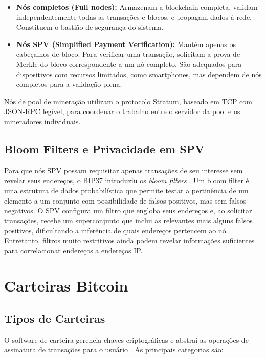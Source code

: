 \documentclass[12pt,a4paper]{report}
\begin{document}
\begin{itemize}
    \item \textbf{Nós completos (Full nodes):} Armazenam a blockchain completa, validam independentemente todas as transações e blocos, e propagam dados à rede. Constituem o bastião de segurança do sistema.
    \item \textbf{Nós SPV (Simplified Payment Verification):} Mantêm apenas os cabeçalhos de bloco. Para verificar uma transação, solicitam a prova de Merkle do bloco correspondente a um nó completo. São adequados para dispositivos com recursos limitados, como smartphones, mas dependem de nós completos para a validação plena.
\end{itemize}

Nós de pool de mineração utilizam o protocolo Stratum, baseado em TCP com JSON-RPC legível, para coordenar o trabalho entre o servidor da pool e os mineradores individuais.

\subsection{Bloom Filters e Privacidade em SPV}

Para que nós SPV possam requisitar apenas transações de seu interesse sem revelar seus endereços, o BIP37 introduziu os \textit{bloom filters} \cite{Bashir2023}. Um bloom filter é uma estrutura de dados probabilística que permite testar a pertinência de um elemento a um conjunto com possibilidade de falsos positivos, mas sem falsos negativos. O SPV configura um filtro que engloba seus endereços e, ao solicitar transações, recebe um superconjunto que inclui as relevantes mais alguns falsos positivos, dificultando a inferência de quais endereços pertencem ao nó. Entretanto, filtros muito restritivos ainda podem revelar informações suficientes para correlacionar endereços a endereços IP.

\section{Carteiras Bitcoin}
\label{sec:wallets}

\subsection{Tipos de Carteiras}

O software de carteira gerencia chaves criptográficas e abstrai as operações de assinatura de transações para o usuário \cite{Bashir2023}. As principais categorias são:
\end{document}
